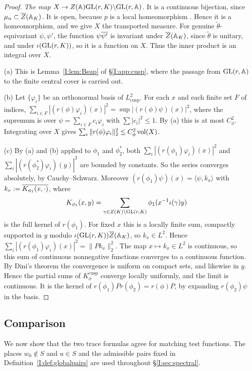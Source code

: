 \begin{proof}
\emph{The map $X\to Z(\mathbb{A})\mathrm{GL}(r,K)\backslash\mathrm{GL}(r,\mathbb{A})$.} It is a continuous bijection, since $\mu_n\subset\overline{Z}(\mathbb{A}_K)$. It is open, because $p$ is a local homeomorphism \cite[\S2]{FK86}. Hence it is a homeomorphism, and we give $X$ the transported measure. For genuine $\tilde\theta$-equivariant $\psi,\psi'$, the function $\psi\overline{\psi'}$ is invariant under $\overline{Z}(\mathbb{A}_K)$, since $\tilde\theta$ is unitary, and under $\iota(\mathrm{GL}(r,K))$, so it is a function on $X$. Thus the inner product is an integral over $X$.

(a) This is Lemma~\ref{I:lem:Bsup} of \S\ref{I:app:cusp}, where the passage from $\mathrm{GL}(r,\mathbb{A})$ to the finite central cover is carried out.

(b) Let $\{\varphi_i\}$ be an orthonormal basis of $L^2_{\mathrm{cusp}}$. For each $x$ and each finite set $F$ of indices, $\sum_{i\in F}|(r(\phi)\varphi_i)(x)|^2=\sup|(r(\phi)\psi)(x)|^2$, where the supremum is over $\psi=\sum_{i\in F}c_i\varphi_i$ with $\sum|c_i|^2\le1$. By (a) this is at most $C_\phi^2$. Integrating over $X$ gives $\sum_i\|r(\phi)\varphi_i\|_2^2\le C_\phi^2\operatorname{vol}(X)$.

(c) By (a) and (b) applied to $\phi_1$ and $\phi_2^*$, both $\sum_i|(r(\phi_1)\varphi_i)(x)|^2$ and $\sum_i|(r(\phi_2^*)\varphi_i)(y)|^2$ are bounded by constants. So the series converges absolutely, by Cauchy--Schwarz. Moreover $(r(\phi_1)\psi)(x)=\langle\psi,k_x\rangle$ with $k_x:=\overline{K_{\phi_1}(x,\cdot)}$, where \[ K_{\phi_1}(x,y)=\sum_{\gamma\in Z(K)\backslash\mathrm{GL}(r,K)}\phi_1(x^{-1}\iota(\gamma)y) \] is the full kernel of $r(\phi_1)$. For fixed $x$ this is a locally finite sum, compactly supported in $y$ modulo $\iota(\mathrm{GL}(r,K))\overline{Z}(\mathbb{A}_K)$, so $k_x\in L^2$. Hence $\sum_i|(r(\phi_1)\varphi_i)(x)|^2=\|Pk_x\|_2^2$. The map $x\mapsto k_x\in L^2$ is continuous, so this sum of continuous nonnegative functions converges to a continuous function. By Dini's theorem the convergence is uniform on compact sets, and likewise in $y$. Hence the partial sums of $K^{\mathrm{cusp}}_\phi$ converge locally uniformly, and the limit is continuous. It is the kernel of $r(\phi_1)Pr(\phi_2)=r(\phi)P$, by expanding $r(\phi_2)\psi$ in the basis.
\end{proof}

\subsection{Comparison}\label{I:subsec:comparison}
We now show that the two trace formulas agree for matching test functions. The places $w_0\notin S$ and $u\in S$ and the admissible pairs fixed in Definition~\ref{I:def:globalpairs} are used throughout \S\ref{I:sec:spectral}.

